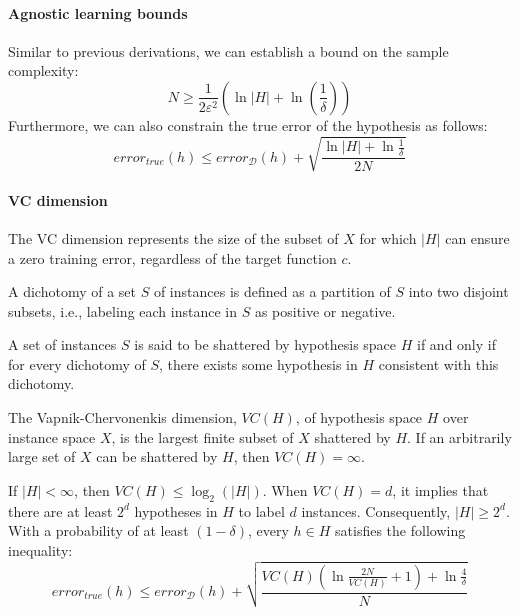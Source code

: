 \paragraph*{Agnostic learning bounds}
Similar to previous derivations, we can establish a bound on the sample complexity:
\[N\geq\dfrac{1}{2\varepsilon^2}\left(\ln\left\lvert H\right\rvert+\ln\left(\dfrac{1}{\delta}\right)\right)\]
Furthermore, we can also constrain the true error of the hypothesis as follows:
\[error_{true}(h)\leq error_{\mathcal{D}}(h)+\sqrt{\dfrac{\ln\left\lvert H \right\rvert+\ln\frac{1}{\delta}}{2N}}\]

\paragraph*{VC dimension}
The VC dimension represents the size of the subset of $X$ for which $\left\lvert H\right\rvert$ can ensure a zero training error, regardless of the target function $c$.
\begin{definition}
    A dichotomy of a set $S$ of instances is defined as a partition of $S$ into two disjoint subsets, i.e., labeling each instance in $S$ as positive or negative.
\end{definition}
\begin{definition}
    A set of instances $S$ is said to be shattered by hypothesis space $H$ if and only if for every dichotomy of $S$, there exists some hypothesis in $H$ consistent with this dichotomy.
\end{definition}
The Vapnik-Chervonenkis dimension, $VC(H)$, of hypothesis space $H$ over instance space $X$, is the largest finite subset of $X$ shattered by $H$.
If an arbitrarily large set of $X$ can be shattered by $H$, then $VC(H)=\infty$.

If $\left\lvert H\right\rvert < \infty$, then $VC(H) \leq \log_2(\left\lvert H\right\rvert)$.
When $VC(H)=d$, it implies that there are at least $2^d$ hypotheses in $H$ to label $d$ instances. 
Consequently, $\left\lvert H\right\rvert \geq 2^d$.
With a probability of at least $(1-\delta)$, every $h\in H$ satisfies the following inequality:
\[error_{true}(h)\leq error_{\mathcal{D}}(h)+\sqrt{\dfrac{VC(H)\left(\ln\frac{2N}{VC(H)}+1\right)+\ln\frac{4}{\delta}}{N}}\]